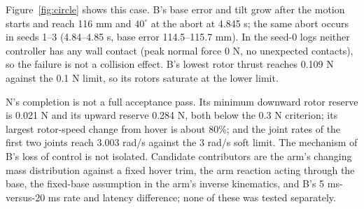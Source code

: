 \documentclass[conference]{IEEEtran}
\begin{document}
Figure~\ref{fig:circle} shows this case. B's base error and tilt grow after the motion starts and reach 116 mm and $40^\circ$ at the abort at 4.845 s; the same abort occurs in seeds 1--3 (4.84--4.85 s, base error 114.5--115.7 mm). In the seed-0 logs neither controller has any wall contact (peak normal force 0 N, no unexpected contacts), so the failure is not a collision effect. B's lowest rotor thrust reaches 0.109 N against the 0.1 N limit, so its rotors saturate at the lower limit.

N's completion is not a full acceptance pass. Its minimum downward rotor reserve is 0.021 N and its upward reserve 0.284 N, both below the 0.3 N criterion; its largest rotor-speed change from hover is about 80\%; and the joint rates of the first two joints reach 3.003 rad/s against the 3 rad/s soft limit. The mechanism of B's loss of control is not isolated. Candidate contributors are the arm's changing mass distribution against a fixed hover trim, the arm reaction acting through the base, the fixed-base assumption in the arm's inverse kinematics, and B's 5 ms-versus-20 ms rate and latency difference; none of these was tested separately.
\end{document}
